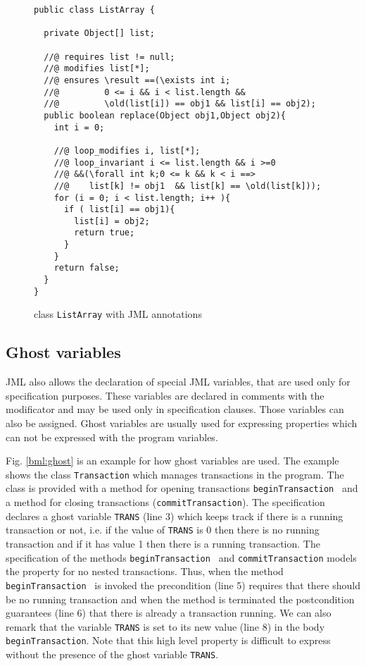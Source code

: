 \begin{figure}[ht!]
\begin{lstlisting}[frame=trbl] 
public class ListArray {
  
  private Object[] list;
  
  //@ requires list != null;
  //@ modifies list[*];
  //@ ensures \result ==(\exists int i; 
  //@         0 <= i && i < list.length && 
  //@         \old(list[i]) == obj1 && list[i] == obj2);
  public boolean replace(Object obj1,Object obj2){
    int i = 0;
    
    //@ loop_modifies i, list[*];
    //@ loop_invariant i <= list.length && i >=0 
    //@ &&(\forall int k;0 <= k && k < i ==> 
    //@    list[k] != obj1  && list[k] == \old(list[k]));
    for (i = 0; i < list.length; i++ ){
      if ( list[i] == obj1){
        list[i] = obj2;
        return true;	
      }
    }
    return false;
  }
}
\end{lstlisting}
\caption{\sc class \mbox{\rm \lstinline!ListArray!} with JML annotations} 
\label{replaceSrc}
\end{figure}

\subsection{Ghost variables}\label{javaVerif:JML:ghost} 
 JML also allows the declaration of special JML variables, that are used only for specification purposes. 
 These variables are declared in comments with the  modificator and may be used only in specification clauses. Those variables 
 can also be assigned. Ghost variables are usually used  for expressing properties which can not be expressed with the program variables.

 Fig. \ref{bml:ghost} is an example for how ghost variables are used. The example shows the class \texttt{Transaction}
 which manages transactions in the program. The class is provided with a method for opening transactions \texttt{beginTransaction } and 
 a method for closing transactions (\texttt{commitTransaction}).  The specification declares a ghost variable
 \texttt{TRANS} (line 3) which keeps track if there is  a running transaction or not, i.e. if the value of  \texttt{TRANS} is 0
 then there is no running transaction and if it has value 1 then there is
 a running transaction. The specification of the methods \texttt{beginTransaction } and \texttt{commitTransaction}
 models the property for no nested transactions. Thus, when the method  \texttt{beginTransaction } is invoked the precondition (line 5) requires
 that there should be no running transaction and when the method is terminated the postcondition guarantees (line 6) that there is already a transaction running.
 We can also remark that the variable  \texttt{TRANS} is set to its new value (line 8) in the  body  \texttt{beginTransaction}.
 Note that this high level property is difficult to express without the presence
 of the ghost variable \texttt{TRANS}.  

